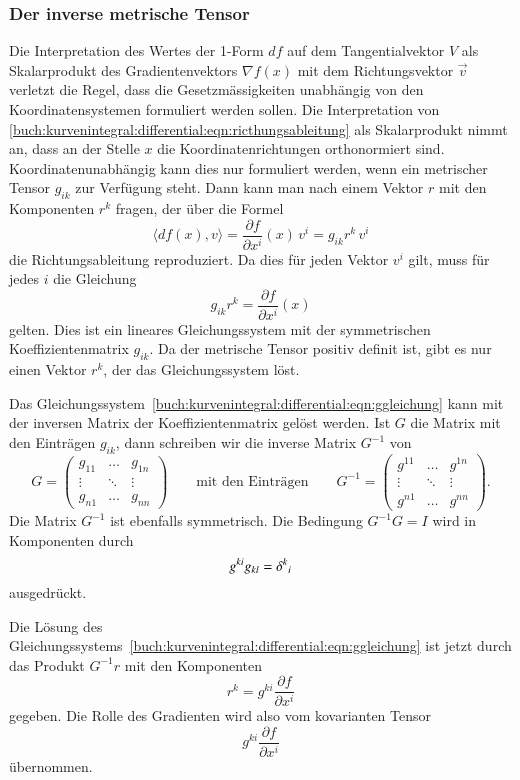 \subsubsection{Der inverse metrische Tensor}
Die Interpretation des Wertes der 1-Form $df$ auf dem Tangentialvektor $V$ 
als Skalarprodukt des Gradientenvektors $\nabla f(x)$ mit dem
Richtungsvektor $\vec{v}$ verletzt die Regel, dass die Gesetzmässigkeiten
unabhängig von den Koordinatensystemen formuliert werden sollen.
Die Interpretation von
\eqref{buch:kurvenintegral:differential:eqn:ricthungsableitung}
als Skalarprodukt nimmt an, dass an der Stelle $x$ die Koordinatenrichtungen
orthonormiert sind.
Koordinatenunabhängig kann dies nur formuliert werden, wenn ein metrischer
Tensor $g_{ik}$ zur Verfügung steht.
Dann kann man nach einem Vektor $r$ mit den Komponenten $r^k$ fragen,
der über die Formel
\[
\langle df(x),v\rangle
=
\frac{\partial f}{\partial x^i}(x)\,v^i
=
g_{ik} r^k\,v^i
\]
die Richtungsableitung reproduziert.
Da dies für jeden Vektor $v^i$ gilt, muss für jedes $i$ die Gleichung
\begin{equation}
g_{ik}r^k = \frac{\partial f}{\partial x^i}(x)
\label{buch:kurvenintegral:differential:eqn:ggleichung}
\end{equation}
gelten.
Dies ist ein lineares Gleichungssystem mit der symmetrischen
Koeffizientenmatrix $g_{ik}$.
Da der metrische Tensor positiv definit ist, gibt es nur einen
Vektor $r^k$, der das Gleichungssystem löst.

Das Gleichungssystem~\eqref{buch:kurvenintegral:differential:eqn:ggleichung}
kann mit der inversen Matrix der Koeffizientenmatrix gelöst
werden.
Ist $G$ die Matrix mit den Einträgen $g_{ik}$, dann schreiben wir
die inverse Matrix $G^{-1}$ von
%
\[
G
=
\begin{pmatrix}
g_{11}&\dots &g_{1n}\\
\vdots&\ddots&\vdots\\
g_{n1}&\dots &g_{nn}
\end{pmatrix}
\qquad
\text{mit den Einträgen}
\qquad
G^{-1}
= 
\begin{pmatrix}
g^{11}&\dots &g^{1n}\\
\vdots&\ddots&\vdots\\
g^{n1}&\dots &g^{nn}
\end{pmatrix}.
\]
Die Matrix $G^{-1}$ ist ebenfalls symmetrisch.
Die Bedingung $G^{-1}G=I$ wird in Komponenten durch
\[
g^{ki}g_{kl}
=
\delta^k\mathstrut_i
\]
ausgedrückt.

Die Lösung des
Gleichungssystems~\eqref{buch:kurvenintegral:differential:eqn:ggleichung}
ist jetzt durch das Produkt $G^{-1}r$ mit den Komponenten
\[
r^k = g^{ki}\frac{\partial f}{\partial x^i}
\]
gegeben.
Die Rolle des Gradienten wird also vom kovarianten Tensor
\[
g^{ki}\frac{\partial f}{\partial x^i}
\]
übernommen.

